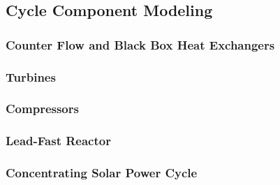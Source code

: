 





\subsection{Cycle Component Modeling}
\subsubsection{Counter Flow and Black Box Heat Exchangers}


\subsubsection{Turbines}


\subsubsection{Compressors}


\subsubsection{Lead-Fast Reactor}


\subsubsection{Concentrating Solar Power Cycle}

